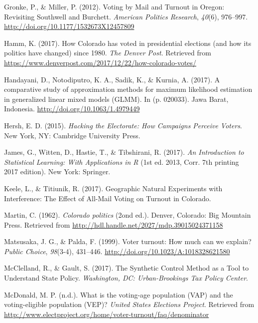 \documentclass[12pt,twoside]{reedthesis}
\begin{document}
  \hypertarget{ref-gronke_voting_2012}{}
  Gronke, P., \& Miller, P. (2012). Voting by Mail and Turnout in Oregon:
  Revisiting Southwell and Burchett. \emph{American Politics Research},
  \emph{40}(6), 976--997. \url{http://doi.org/10.1177/1532673X12457809}
  
  \hypertarget{ref-hamm_how_2017}{}
  Hamm, K. (2017). How Colorado has voted in presidential elections (and
  how its politics have changed) since 1980. \emph{The Denver Post}.
  Retrieved from
  \url{https://www.denverpost.com/2017/12/22/how-colorado-votes/}
  
  \hypertarget{ref-handayani_comparative_2017}{}
  Handayani, D., Notodiputro, K. A., Sadik, K., \& Kurnia, A. (2017). A
  comparative study of approximation methods for maximum likelihood
  estimation in generalized linear mixed models (GLMM). In (p. 020033).
  Jawa Barat, Indonesia. \url{http://doi.org/10.1063/1.4979449}
  
  \hypertarget{ref-hersh_hacking_2015}{}
  Hersh, E. D. (2015). \emph{Hacking the Electorate: How Campaigns
  Perceive Voters}. New York, NY: Cambridge University Press.
  
  \hypertarget{ref-james_introduction_2017}{}
  James, G., Witten, D., Hastie, T., \& Tibshirani, R. (2017). \emph{An
  Introduction to Statistical Learning: With Applications in R} (1st ed.
  2013, Corr. 7th printing 2017 edition). New York: Springer.
  
  \hypertarget{ref-keele_geographic_2017}{}
  Keele, L., \& Titiunik, R. (2017). Geographic Natural Experiments with
  Interference: The Effect of All-Mail Voting on Turnout in Colorado.
  
  \hypertarget{ref-martin_colorado_1962}{}
  Martin, C. (1962). \emph{Colorado politics} (2ond ed.). Denver,
  Colorado: Big Mountain Press. Retrieved from
  \url{http://hdl.handle.net/2027/mdp.39015024371158}
  
  \hypertarget{ref-matsusaka_voter_1999}{}
  Matsusaka, J. G., \& Palda, F. (1999). Voter turnout: How much can we
  explain? \emph{Public Choice}, \emph{98}(3-4), 431--446.
  \url{http://doi.org/10.1023/A:1018328621580}
  
  \hypertarget{ref-mcclelland_synthetic_2017}{}
  McClelland, R., \& Gault, S. (2017). The Synthetic Control Method as a
  Tool to Understand State Policy. \emph{Washington, DC: Urban-Brookings
  Tax Policy Center}.
  
  \hypertarget{ref-mcdonald_what_nodate}{}
  McDonald, M. P. (n.d.). What is the voting-age population (VAP) and the
  voting-eligible population (VEP)? \emph{United States Elections
  Project}. Retrieved from
  \url{http://www.electproject.org/home/voter-turnout/faq/denominator}
  
\end{document}
